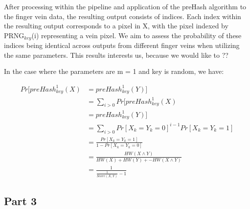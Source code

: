 After processing within the pipeline and application of the preHash algorithm to the finger vein data, the resulting output consists of indices. Each index within the resulting output corresponds to a pixel in X, with the pixel indexed by PRNG$_{key}$(i) representing a vein pixel. We aim to assess the probability of these indices being identical across outputs from different finger veins when utilizing the same parameters. This results interests us, because we would like to ??


In the case where the parameters are m = 1 and key is random, we have: 

\begin{equation}
    \begin{aligned}
        Pr[preHash_{key}^1(X) &= preHash_{key}^1(Y)]\\
        &= \sum_{i > 0} Pr[preHash_{key}^1(X)\\
        &= preHash_{key}^1(Y)]\\
        &= \sum_{i > 0} Pr[X_k = Y_k = 0]^{i - 1} Pr[X_k = Y_k = 1]\\
        &= \frac{Pr[X_k = Y_k = 1]}{1 - Pr[X_k = Y_k = 0]}\\
        &= \frac{HW(X \land Y)}{HW(X) + HW(Y) + - HW(X \land Y)}\\
        &= \frac{1}{\frac{1}{Score(X, Y)} - 1}
    \end{aligned}
\end{equation}




\subsection{Part 3}